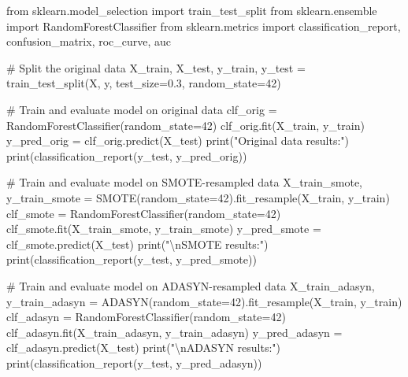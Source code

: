 \documentclass[
  letterpaper,
  DIV=11,
  numbers=noendperiod]{scrreprt}
\newenvironment{Shaded}{\begin{snugshade}}{\end{snugshade}}
\newcommand{\BuiltInTok}[1]{\textcolor[rgb]{0.00,0.23,0.31}{#1}}
\newcommand{\CharTok}[1]{\textcolor[rgb]{0.13,0.47,0.30}{#1}}
\newcommand{\CommentTok}[1]{\textcolor[rgb]{0.37,0.37,0.37}{#1}}
\newcommand{\DecValTok}[1]{\textcolor[rgb]{0.68,0.00,0.00}{#1}}
\newcommand{\FloatTok}[1]{\textcolor[rgb]{0.68,0.00,0.00}{#1}}
\newcommand{\ImportTok}[1]{\textcolor[rgb]{0.00,0.46,0.62}{#1}}
\newcommand{\NormalTok}[1]{\textcolor[rgb]{0.00,0.23,0.31}{#1}}
\newcommand{\OperatorTok}[1]{\textcolor[rgb]{0.37,0.37,0.37}{#1}}
\newcommand{\StringTok}[1]{\textcolor[rgb]{0.13,0.47,0.30}{#1}}
\begin{document}
\begin{Shaded}
\begin{Highlighting}[]
\ImportTok{from}\NormalTok{ sklearn.model\_selection }\ImportTok{import}\NormalTok{ train\_test\_split}
\ImportTok{from}\NormalTok{ sklearn.ensemble }\ImportTok{import}\NormalTok{ RandomForestClassifier}
\ImportTok{from}\NormalTok{ sklearn.metrics }\ImportTok{import}\NormalTok{ classification\_report, confusion\_matrix, roc\_curve, auc}

\CommentTok{\# Split the original data}
\NormalTok{X\_train, X\_test, y\_train, y\_test }\OperatorTok{=}\NormalTok{ train\_test\_split(X, y, test\_size}\OperatorTok{=}\FloatTok{0.3}\NormalTok{, random\_state}\OperatorTok{=}\DecValTok{42}\NormalTok{)}

\CommentTok{\# Train and evaluate model on original data}
\NormalTok{clf\_orig }\OperatorTok{=}\NormalTok{ RandomForestClassifier(random\_state}\OperatorTok{=}\DecValTok{42}\NormalTok{)}
\NormalTok{clf\_orig.fit(X\_train, y\_train)}
\NormalTok{y\_pred\_orig }\OperatorTok{=}\NormalTok{ clf\_orig.predict(X\_test)}
\BuiltInTok{print}\NormalTok{(}\StringTok{"Original data results:"}\NormalTok{)}
\BuiltInTok{print}\NormalTok{(classification\_report(y\_test, y\_pred\_orig))}

\CommentTok{\# Train and evaluate model on SMOTE{-}resampled data}
\NormalTok{X\_train\_smote, y\_train\_smote }\OperatorTok{=}\NormalTok{ SMOTE(random\_state}\OperatorTok{=}\DecValTok{42}\NormalTok{).fit\_resample(X\_train, y\_train)}
\NormalTok{clf\_smote }\OperatorTok{=}\NormalTok{ RandomForestClassifier(random\_state}\OperatorTok{=}\DecValTok{42}\NormalTok{)}
\NormalTok{clf\_smote.fit(X\_train\_smote, y\_train\_smote)}
\NormalTok{y\_pred\_smote }\OperatorTok{=}\NormalTok{ clf\_smote.predict(X\_test)}
\BuiltInTok{print}\NormalTok{(}\StringTok{"}\CharTok{\textbackslash{}n}\StringTok{SMOTE results:"}\NormalTok{)}
\BuiltInTok{print}\NormalTok{(classification\_report(y\_test, y\_pred\_smote))}

\CommentTok{\# Train and evaluate model on ADASYN{-}resampled data}
\NormalTok{X\_train\_adasyn, y\_train\_adasyn }\OperatorTok{=}\NormalTok{ ADASYN(random\_state}\OperatorTok{=}\DecValTok{42}\NormalTok{).fit\_resample(X\_train, y\_train)}
\NormalTok{clf\_adasyn }\OperatorTok{=}\NormalTok{ RandomForestClassifier(random\_state}\OperatorTok{=}\DecValTok{42}\NormalTok{)}
\NormalTok{clf\_adasyn.fit(X\_train\_adasyn, y\_train\_adasyn)}
\NormalTok{y\_pred\_adasyn }\OperatorTok{=}\NormalTok{ clf\_adasyn.predict(X\_test)}
\BuiltInTok{print}\NormalTok{(}\StringTok{"}\CharTok{\textbackslash{}n}\StringTok{ADASYN results:"}\NormalTok{)}
\BuiltInTok{print}\NormalTok{(classification\_report(y\_test, y\_pred\_adasyn))}


\end{Highlighting}
\end{Shaded}
\end{document}
